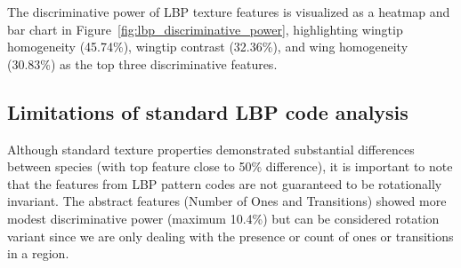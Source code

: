 \documentclass[a4paper,12pt]{report}
\begin{document}
The discriminative power of LBP texture features is visualized as a heatmap and bar chart in Figure~\ref{fig:lbp_discriminative_power}, highlighting wingtip homogeneity (45.74\%), wingtip contrast (32.36\%), and wing homogeneity (30.83\%) as the top three discriminative features.

\subsection{Limitations of standard LBP code analysis}
\label{subsec:feature_limitations}

Although standard texture properties demonstrated substantial differences between species (with top feature close to 50\% difference), it is important to note that the features from LBP pattern codes are not guaranteed to be rotationally invariant. The abstract features (Number of Ones and Transitions) showed more modest discriminative power (maximum 10.4\%) but can be considered rotation variant since we are only dealing with the presence or count of ones or transitions in a region.
\end{document}
